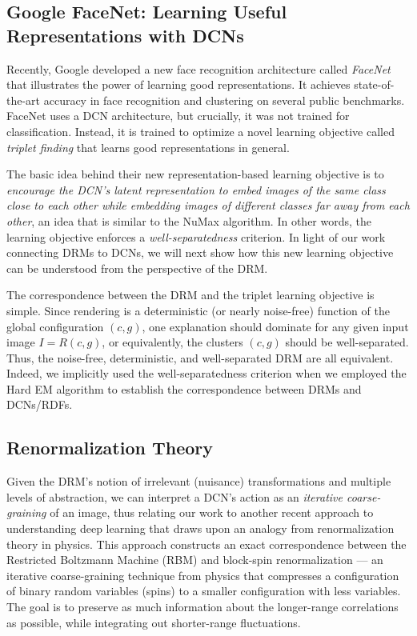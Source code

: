 \documentclass[12pt]{article}
\begin{document}
\subsection{Google FaceNet: Learning Useful Representations with DCNs}

Recently, Google developed a new face recognition architecture called \emph{FaceNet} \cite{schroff2015facenet} that illustrates the power of learning good representations.  It achieves state-of-the-art accuracy in face recognition and clustering on several public benchmarks.
FaceNet uses a DCN architecture, but crucially, it was not trained for classification. Instead, it is trained to optimize a novel learning objective called \emph{triplet finding} that learns good representations in general. 

The basic idea behind their new representation-based learning objective is to \emph{encourage the DCN's latent representation to embed images of the same class close to each other while embedding images of different classes far away from each other}, an idea that is similar to the NuMax algorithm\cite{hegde2012convex}. In other words, the learning objective enforces a \emph{well-separatedness} criterion. In light of our work connecting DRMs to DCNs, we will next show how this new learning objective can be understood from the perspective of the DRM.

The correspondence between the DRM and the triplet learning objective is simple. Since rendering is a deterministic (or nearly noise-free) function of the global configuration $(c,g)$, one explanation should dominate for any given input image $I = R(c,g)$, or equivalently, the clusters $(c,g)$ should be well-separated.
Thus, the noise-free, deterministic, and well-separated DRM are all equivalent. 
Indeed, we implicitly used the well-separatedness criterion when we employed the Hard EM algorithm to establish the correspondence between DRMs and DCNs/RDFs. 

\subsection{Renormalization Theory}

Given the DRM's notion of irrelevant (nuisance) transformations and multiple levels of abstraction, we can interpret a DCN's action as an {\em iterative coarse-graining} of an image, thus relating our work to another recent approach to understanding deep learning that draws upon an analogy from renormalization theory in physics\cite{mehta2014exact}.  This approach constructs an exact correspondence between the Restricted Boltzmann Machine (RBM) and block-spin renormalization --- an iterative coarse-graining technique from physics that compresses a configuration of binary random variables (spins) to a smaller configuration with less variables. The goal is to preserve as much information about the longer-range correlations as possible, while integrating out shorter-range fluctuations. 
\end{document}
